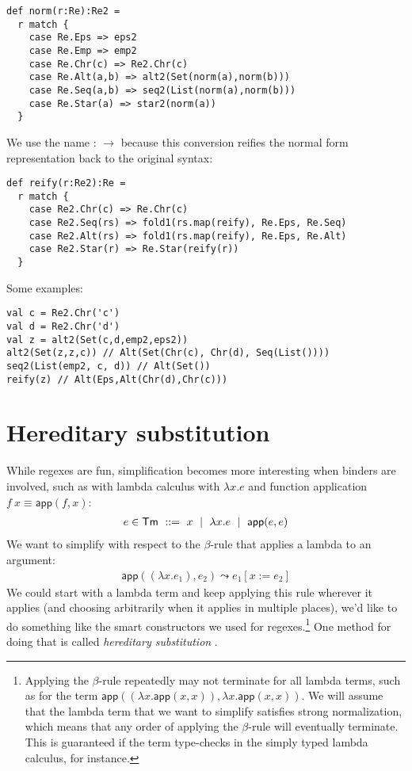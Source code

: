 \begin{lstlisting}
def norm(r:Re):Re2 =
  r match {
    case Re.Eps => eps2
    case Re.Emp => emp2
    case Re.Chr(c) => Re2.Chr(c)
    case Re.Alt(a,b) => alt2(Set(norm(a),norm(b)))
    case Re.Seq(a,b) => seq2(List(norm(a),norm(b)))
    case Re.Star(a) => star2(norm(a))
  }
\end{lstlisting}

We use the name  :  $\to$  because this conversion reifies the normal form representation back to the original syntax:

\begin{lstlisting}
def reify(r:Re2):Re =
  r match {
    case Re2.Chr(c) => Re.Chr(c)
    case Re2.Seq(rs) => fold1(rs.map(reify), Re.Eps, Re.Seq)
    case Re2.Alt(rs) => fold1(rs.map(reify), Re.Eps, Re.Alt)
    case Re2.Star(r) => Re.Star(reify(r))
  }
\end{lstlisting}

Some examples:
\begin{lstlisting}
val c = Re2.Chr('c')
val d = Re2.Chr('d')
val z = alt2(Set(c,d,emp2,eps2))
alt2(Set(z,z,c)) // Alt(Set(Chr(c), Chr(d), Seq(List())))
seq2(List(emp2, c, d)) // Alt(Set())
reify(z) // Alt(Eps,Alt(Chr(d),Chr(c)))
\end{lstlisting}


\section{Hereditary substitution}

\newcommand{\ap}{\mathsf{app}}
\newcommand{\steps}{\leadsto}

While regexes are fun, simplification becomes more interesting when binders are involved, such as with lambda calculus with $\lambda x. e$ and function application $f\ x \equiv \ap(f,x)$:
\begin{align*}
  e \in \mathsf{Tm} \ ::=\  x \md \lambda x. e \md \ap(e,e)
\end{align*}
We want to simplify with respect to the $\beta$-rule that applies a lambda to an argument:
\begin{align*}
  \ap((\lambda x. e_1), e_2) \steps e_1[x := e_2]
\end{align*}
We could start with a lambda term and keep applying this rule wherever it applies (and choosing arbitrarily when it applies in multiple places), we'd like to do something like the smart constructors we used for regexes.\footnote{Applying the $\beta$-rule repeatedly may not terminate for all lambda terms, such as for the term $\ap((\lambda x. \ap(x,x)), \lambda x. \ap(x,x))$. We will assume that the lambda term that we want to simplify satisfies strong normalization, which means that any order of applying the $\beta$-rule will eventually terminate. This is guaranteed if the term type-checks in the simply typed lambda calculus, for instance.}
One method for doing that is called \emph{hereditary substitution} \cite{keller:inria-00520606}.

